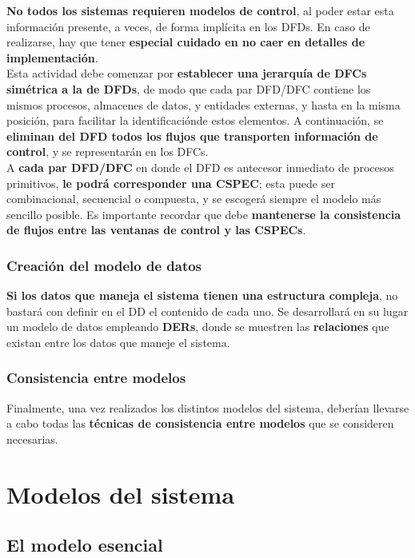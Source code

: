 \textbf{No todos los sistemas requieren modelos de control}, al poder estar esta información presente, a veces, de forma implícita en los DFDs. En caso de realizarse, hay que tener \textbf{especial cuidado en no caer en detalles de implementación}.\\

Esta actividad debe comenzar por \textbf{establecer una jerarquía de DFCs simétrica a la de DFDs}, de modo que cada par DFD/DFC contiene los mismos procesos, almacenes de datos, y entidades externas, y hasta en la misma posición, para facilitar la identificaciónde estos elementos. A continuación, se \textbf{eliminan del DFD todos los flujos que transporten información de control}, y se representarán en los DFCs.\\

A \textbf{cada par DFD/DFC} en donde el DFD es antecesor inmediato de procesos primitivos, \textbf{le podrá corresponder una CSPEC}; esta puede ser combinacional, secuencial o compuesta, y se escogerá siempre el modelo más sencillo posible. Es importante recordar que debe \textbf{mantenerse la consistencia de flujos entre las ventanas de control y las CSPECs}.

\subsubsection{Creación del modelo de datos}

\textbf{Si los datos que maneja el sistema tienen una estructura compleja}, no bastará con definir en el DD el contenido de cada uno. Se desarrollará en su lugar un modelo de datos empleando \textbf{DERs}, donde se muestren las \textbf{relaciones} que existan entre los datos que maneje el sistema.

\subsubsection{Consistencia entre modelos}

Finalmente, una vez realizados los distintos modelos del sistema, deberían llevarse a cabo todas las \textbf{técnicas de consistencia entre modelos} que se consideren necesarias.


\section{Modelos del sistema}

\subsection{El modelo esencial}

